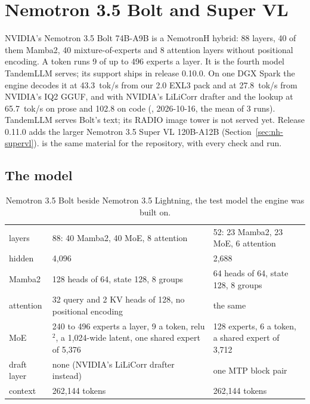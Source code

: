 \chapter{Nemotron 3.5 Bolt and Super VL}\label{ch:nemotron}

NVIDIA's Nemotron 3.5 Bolt 74B-A9B is a NemotronH hybrid: 88 layers, 40 of them Mamba2, 40 mixture-of-experts and 8 attention layers without positional encoding. A token runs 9 of up to 496 experts a layer. It is the fourth model TandemLLM serves; its support ships in release 0.10.0. On one DGX Spark the engine decodes it at 43.3~tok/s from our 2.0 EXL3 pack and at 27.8~tok/s from NVIDIA's IQ2 GGUF, and with NVIDIA's LiLiCorr drafter and the lookup at 65.7~tok/s on prose and 102.8 on code (\measured, 2026-10-16, the mean of 3 runs). TandemLLM serves Bolt's text; its RADIO image tower is not served yet. Release 0.11.0 adds the larger Nemotron 3.5 Super VL 120B-A12B (Section~\ref{sec:nh-supervl}).  is the same material for the repository, with every check and run.

\section{The model}

\begin{table}[htbp]
\centering\small
\caption{Nemotron 3.5 Bolt beside Nemotron 3.5 Lightning, the test model the engine was built on.}\label{tab:nh-model}
\begin{tabularx}{\linewidth}{@{}L{.2\linewidth}YY@{}}
\toprule
{} &  &  \\
\midrule
layers & 88: 40 Mamba2, 40 MoE, 8 attention & 52: 23 Mamba2, 23 MoE, 6 attention \\
hidden & 4,096 & 2,688 \\
Mamba2 & 128 heads of 64, state 128, 8 groups & 64 heads of 64, state 128, 8 groups \\
attention & 32 query and 2 KV heads of 128, no positional encoding & the same \\
MoE & 240 to 496 experts a layer, 9 a token, relu$^2$, a 1,024-wide latent, one shared expert of 5,376 & 128 experts, 6 a token, a shared expert of 3,712 \\
draft layer & none (NVIDIA's LiLiCorr drafter instead) & one MTP block pair \\
context & 262,144 tokens & 262,144 tokens \\
\bottomrule
\end{tabularx}
\end{table}

